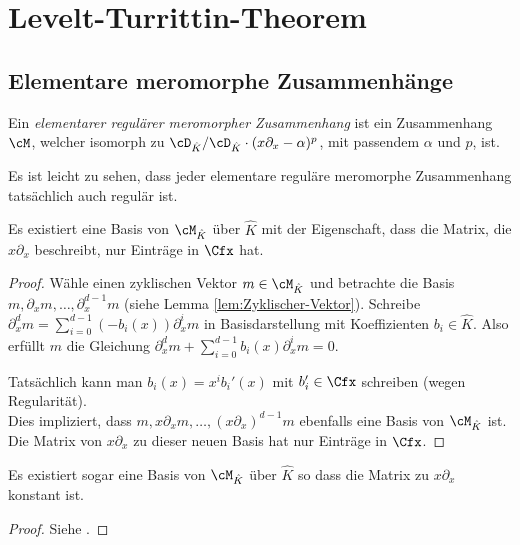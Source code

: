 \chapter{Levelt-\!Turrittin-\!Theorem}
\section{Elementare meromorphe Zusammenhänge}
\begin{defn}
Ein \emph{elementarer regulärer meromorpher Zusammenhang} ist ein Zusammenhang
$\cM$, welcher isomorph zu $\cD_{\hat K}/\cD_{\hat K}\cdot
(x\partial_x-\alpha)^p$, mit passendem $\alpha$ und $p$, ist.
\end{defn}
\begin{bem}
Es ist leicht zu sehen, dass jeder elementare reguläre meromorphe Zusammenhang
tatsächlich auch regulär ist.
\end{bem}

\begin{lem}
Es existiert eine Basis von $\cM_{\hat K}$ über $\hat K$ mit der Eigenschaft,
dass die Matrix, die $x\partial_x$ beschreibt, nur Einträge in $\Cfx$ hat.
\end{lem}
\begin{comment}
\cite[Lem 5.2.1.]{sabbah_cimpa90}
\end{comment}
\begin{proof}
Wähle einen zyklischen Vektor $m\in\cM_{\hat K}$ %
 und betrachte die Basis $m,\partial_x m,\dots,\partial_x^{d-1}m$ (siehe Lemma
\ref{lem:Zyklischer-Vektor}).
Schreibe $\partial_x^dm=\sum_{i=0}^{d-1}(-b_i(x))\partial_x^im$ in
Basisdarstellung mit Koeffizienten $b_i\in\hat K$.
Also erfüllt $m$ die Gleichung
$\partial_x^dm+\sum_{i=0}^{d-1}b_i(x)\partial_x^im=0$.\\
\begin{comment} TODO: bis hier schon klar \end{comment}
Tatsächlich kann man $b_i(x)=x^ib_i'(x)$ mit $b_i'\in \Cfx$ schreiben (wegen
Regularität).\\
Dies impliziert, dass $m,x\partial_xm,\dots,(x\partial_x)^{d-1}m$ ebenfalls
eine Basis von $\cM_{\hat K}$ ist.\\
Die Matrix von $x\partial_x$ zu dieser neuen Basis hat nur Einträge in $\Cfx$.
\end{proof}
\begin{lem}
Es existiert sogar eine Basis von $\cM_{\hat K}$ über $\hat K$ so dass die
Matrix zu $x\partial_x$ konstant ist.
\end{lem}
\begin{proof}
Siehe \cite[Thm 5.2.2]{sabbah_cimpa90}.
\end{proof}


